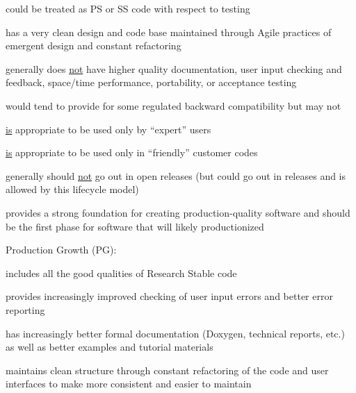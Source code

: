 \documentclass[11pt]{SANDreport}
\begin{document}
\begin{compactenum}
\begin{compactitem}
{}\item could be treated as PS or SS code with respect to testing

{}\item has a very clean design and code base maintained through Agile
practices of emergent design and constant refactoring

{}\item generally does {}\underline{not} have higher quality
documentation, user input checking and feedback, space/time
performance, portability, or acceptance testing

{}\item would tend to provide for some regulated backward
compatibility but may not

{}\item {}\underline{is} appropriate to be used only by ``expert''
users

{}\item {}\underline{is} appropriate to be used only in ``friendly''
customer codes

{}\item generally should {}\underline{not} go out in open releases
(but could go out in releases and is allowed by this lifecycle model)

{}\item provides a strong foundation for creating production-quality
software and should be the first phase for software that will likely
productionized

\end{compactitem}

{}\item Production Growth (PG):

\begin{compactitem}

{}\item includes all the good qualities of Research Stable code

{}\item provides increasingly improved checking of user input errors
and better error reporting

{}\item has increasingly better formal documentation (Doxygen,
technical reports, etc.) as well as better examples and tutorial
materials

{}\item maintains clean structure through constant refactoring of the
code and user interfaces to make more consistent and easier to
maintain


\end{compactitem}
\end{compactenum}
\end{document}
